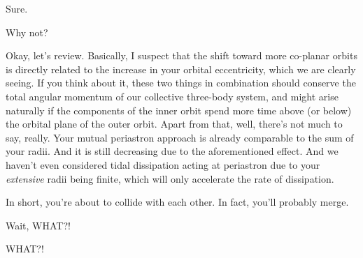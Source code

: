 \documentclass[main.tex]{subfiles}
\begin{document}
\par \Alcyone Sure.

\par \Taygete Why not?

\par \Celaeno Okay, let's review.  Basically, I suspect that the shift toward more co-planar orbits is directly related to the increase in your orbital eccentricity, which we are clearly seeing.  If you think about it, these two things in combination should conserve the total angular momentum of our collective three-body system, and might arise naturally if the components of the inner orbit spend more time above (or below) the orbital plane of the outer orbit.  Apart from that, well, there's not much to say, really.  Your mutual periastron approach is already comparable to the sum of your radii.  And it is still decreasing due to the aforementioned effect.  And we haven't even considered tidal dissipation acting at periastron due to your \textit{extensive} radii being finite, which will only accelerate the rate of dissipation.

\par \Celaeno In short, you're about to collide with each other.  In fact, you'll probably merge.

\par \Taygete  Wait, WHAT?!

\par \Alcyone  WHAT?!
\end{document}
